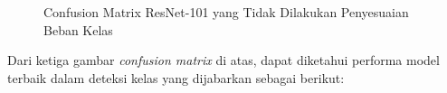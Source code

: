 \begin{figure}[hbtp]
	\centering
	\qquad
	\qquad
	\caption{Confusion Matrix ResNet-101 yang Tidak Dilakukan Penyesuaian Beban Kelas}
	\label{fig:confRes101}
\end{figure}

Dari ketiga gambar \emph{confusion matrix} di atas, dapat diketahui performa model terbaik dalam deteksi kelas yang dijabarkan sebagai berikut:

